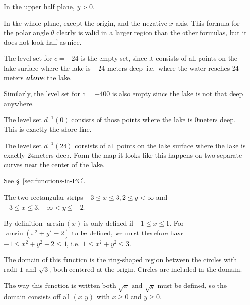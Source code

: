 \item[{\bfseries(III5.8d)}]

In the upper half plane, $y>0$.
\bigskip

\item[{\bfseries(III5.8e)}]

In the whole plane, except the origin, and the negative $x$-axis.  This formula for
the polar angle $\theta$ clearly is valid in a larger region than the other formulas,
but it does not look half as nice.
\bigskip

\item[{\bfseries(III5.9)}]

The level set for $c=-24$ is the empty set, since it consists of all points on
the lake surface where the lake is $-24$ meters deep--i.e.~where the water
reaches $24$meters {\bfseries\itshape above} the lake.

Similarly, the level set for $c=+400$ is also empty since the lake is not that
deep anywhere.

The level set $d^{-1}(0)$ consists of those points where the lake is $0$meters
deep.  This is exactly the shore line.

The level set $d^{-1}(24)$ consists of all points on the lake surface where the
lake is exactly $24$meters deep.  Form the map it looks like this happens on two
separate curves near the center of the lake.
\bigskip

\item[{\bfseries(III5.10)}]

See \S~\ref{sec:functions-in-PC}.
\bigskip

\item[{\bfseries(III5.11a)}]

The two rectangular strips $-3\leq x\leq3, 2\leq y<\infty$ and
$-3\leq x\leq3, -\infty<y\leq-2$.
\bigskip

\item[{\bfseries(III5.11b)}]

By definition $\arcsin(x)$ is only defined if $-1\leq x\leq1$.
For $\arcsin(x^2+y^2-2)$ to be defined, we must therefore have
$-1\leq x^2+y^2-2 \leq 1$, i.e.\ $1\leq x^2+y^2 \leq 3$.

The domain of this function is
the ring-shaped region between the circles with radii $1$ and
$\sqrt{3}$, both centered at the origin.
Circles are included in the domain.
\bigskip

\item[{\bfseries(III5.11c)}]

The way this function is written both $\sqrt x$ and $\sqrt y$ must be defined,
so the domain consists off all $(x,y)$ with $x\geq0$ and $y\geq0$.
\bigskip

